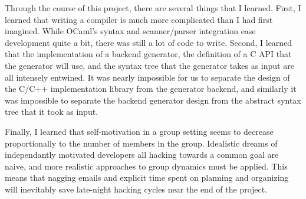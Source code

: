 Through the course of this project, there are several things that I learned.
First, I learned that writing a compiler is
much more complicated than I had first imagined. While OCaml's syntax and scanner/parser
integration ease development quite a bit, there was still a lot of code to write.
Second, I learned that the implementation of a backend generator, the definition of
a C API that the generator will use, and the syntax tree that the generator takes as
input are all intensely entwined. It was nearly impossible for us to separate the
design of the C/C++ implementation library from the generator backend, and similarly it
was impossible to separate the backend generator design from the abstract syntax tree
that it took as input.

Finally, I learned that self-motivation in a group setting seems to decrease proportionally
to the number of members in the group. Idealistic dreams of independantly motivated
developers all hacking towards a common goal are naive, and more realistic approaches to
group dynamics must be applied. This means that nagging emails and explicit time spent
on planning and organizing will inevitably save late-night hacking cycles near the end
of the project.
